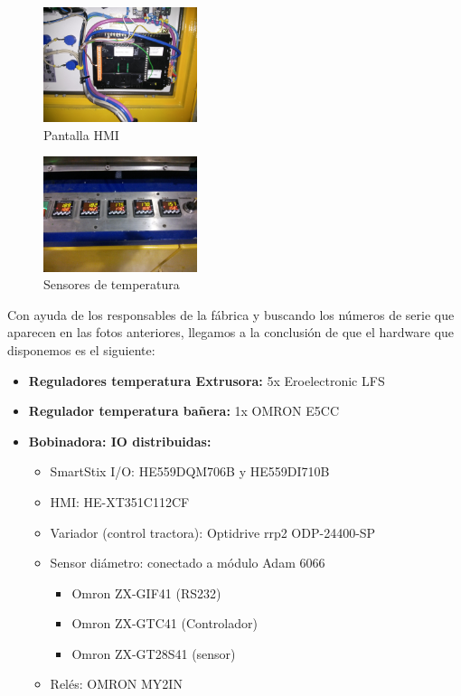     \begin{figure}[H]
            \centering
            \includegraphics[width=0.4\textwidth]{images/huesca/IMG_20141216_175108.jpg}
            \caption{Pantalla HMI}
            \label{fig:hardware_HMI}
    \end{figure}

     \begin{figure}[H]
            \centering
            \includegraphics[width=0.4\textwidth]{images/huesca/IMG_20141216_175204.jpg}
            \caption{Sensores de temperatura}
            \label{fig:hardware_temperatura}
    \end{figure}

Con ayuda de los responsables de la fábrica y buscando los números de serie que aparecen en las fotos anteriores, llegamos a la conclusión de que el hardware que disponemos es el siguiente:

\begin{itemize}
	\item \textbf{Reguladores temperatura Extrusora:} 5x Eroelectronic LFS
	\item \textbf{Regulador temperatura bañera:} 1x OMRON E5CC
	\item \textbf{Bobinadora: IO distribuidas: }
	\begin{itemize}

       \item {SmartStix I/O:} HE559DQM706B y HE559DI710B
       \item{HMI:} HE-XT351C112CF
        \item{Variador (control tractora):} Optidrive rrp2 ODP-24400-SP
        \item{Sensor diámetro:} conectado a módulo Adam 6066
        	\begin{itemize}
        				\item Omron ZX-GIF41 (RS232)
        				\item Omron ZX-GTC41 (Controlador)
                        \item Omron ZX-GT28S41 (sensor)
             \end{itemize}
        \item Relés: OMRON MY2IN
    \end{itemize}
\end{itemize}

